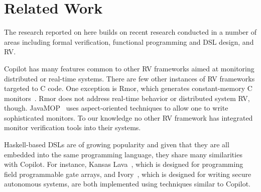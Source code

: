 \section{Related Work}\label{sec:related}
The research reported on here builds on recent  research conducted in a number
of areas including formal verification, functional programming and
DSL design, and RV. 

Copilot has many features common to other RV frameworks aimed at
 monitoring distributed or real-time systems.  
There are few other instances of RV frameworks targeted to C code.  One exception is {\sc
 Rmor}, which generates constant-memory C monitors~\cite{havelundc}.  {\sc
  Rmor} does not address real-time behavior or distributed system RV,
though.    JavaMOP~\cite{javamop}  uses aspect-oriented techniques
to allow one to write sophisticated monitors. To our knowledge no
other RV framework has integrated monitor verification tools into
their systems. 


Haskell-based DSLs are of growing popularity and given that they are all
embedded into the same programming language, they share many
similarities with Copilot. For instance, 
 Kansas Lava~\cite{Gill:14:DSLs}, which is designed for
programming  field programmable gate arrays,  and 
Ivory~\cite{pike-plpv14}, which is designed for writing secure autonomous
systems, are both implemented using techniques similar to Copilot.  




